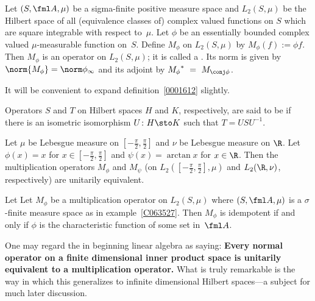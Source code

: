 \begin{exam}\label{C063527} Let $(S,\fml A, \mu)$ be a sigma-finite positive measure space and $L_2(S,\mu)$
be the Hilbert space of all (equivalence classes of) complex valued functions on $S$
which are square integrable with respect to~$\mu$.  Let $\phi$ be an essentially bounded
complex valued $\mu$-measurable function on~$S$. Define
$M_\phi$ on $L_2(S,\mu)$ by $M_\phi(f) := \phi f$.  Then $M_\phi$ is an operator on $L_2(S,\mu)$; it is called a
. Its norm is given by $\norm{M_\phi} = \norm\phi_\infty$ and its
adjoint by ${M_\phi}^*~=~M_{\conj\phi}$.
\end{exam}

It will be convenient to expand definition~\ref{0001612} slightly.

\begin{defn} Operators $S$ and $T$ on Hilbert spaces $H$ and $K$, respectively, are said to be
 if there is an isometric isomorphism $U\colon H \sto K$ such that $T = USU^{-1}$.

\end{defn}

\begin{exam} Let $\mu$ be Lebesgue measure on $[-\frac\pi2, \frac\pi2]$ and $\nu$ be Lebesgue measure on $\R$.
Let $\phi(x) = x$ for $x \in [-\frac\pi2, \frac\pi2]$ and $\psi(x) = \arctan x$ for $x \in \R$.  Then the
multiplication operators $M_\phi$ and $M_\psi$ (on $L_2([-\frac\pi2, \frac\pi2], \mu)$ and $L_2(\R, \nu)$,
respectively) are unitarily equivalent.
\end{exam}

\begin{exam} Let Let $M_\phi$ be a multiplication operator on $L_2(S,\mu)$ where $(S,\fml A,\mu)$ is a
$\sigma$-finite measure space as in example~\ref{C063527}.  Then $M_\phi$ is idempotent if and only if
$\phi$ is the characteristic function of some set in~$\fml A$.
\end{exam}

One may regard the
 in beginning linear algebra as saying: \textbf{Every normal operator on a finite
dimensional inner product space is unitarily equivalent to a multiplication operator.}  What is truly
remarkable is the way in which this generalizes to infinite dimensional Hilbert spaces---a subject
for much later discussion.

